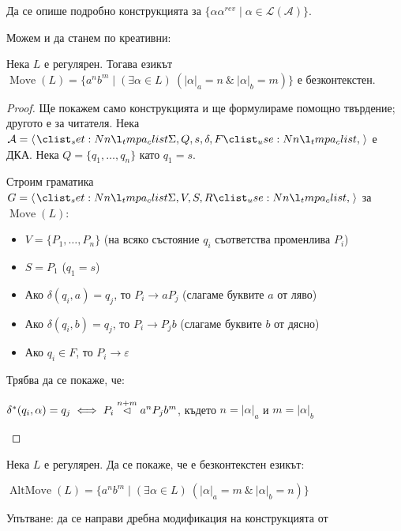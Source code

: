 \begin{problem}
Да се опише подробно конструкцията за $\{ \alpha \alpha^{rev} \mid \alpha \in \mathcal{L(A)} \}$.
\end{problem}

Можем и да станем по креативни:
\begin{claim}
    Нека $L$ е регулярен.
    Тогава езикът $\operatorname{Move}(L) = \{ a^nb^m \mid (\exists \alpha \in L) \: (|\alpha|_a = n \: \& \: |\alpha|_b = m) \}$ е безконтекстен.
\end{claim}

\begin{proof}
    Ще покажем само конструкцията и ще формулираме помощно твърдение; другото е за читателя.
    Нека $\mathcal{A} = \opair{\Sigma, Q, s, \delta, F}$ е ДКА.
    Нека $Q = \{ q_1, \dots, q_n \}$ като $q_1 = s$.

    Строим граматика $G = \opair{\Sigma, V, S, R}$ за $\operatorname{Move}(L)$:
    \begin{itemize}
        \item $V = \{ P_1, \dots, P_n \}$ (на всяко състояние $q_i$ съответства променлива $P_i$)
        \item $S = P_1$ ($q_1 = s$)
        \item Ако $\delta(q_i, a) = q_j$, то $P_i \rightarrow a P_j$ (слагаме буквите $a$ от ляво)
        \item Ако $\delta(q_i, b) = q_j$, то $P_i \rightarrow P_j b$ (слагаме буквите $b$ от дясно)
        \item Ако $q_i \in F$, то $P_i \rightarrow \varepsilon$
    \end{itemize}

    Трябва да се покаже, че:
    \begin{center}
        $\delta^*(q_i, \alpha) = q_j \iff P_i \stackrel{n + m}{\vartriangleleft} a^{n} P_j b^{m}$, където $n = |\alpha|_a$ и $m = |\alpha|_b$
    \end{center}
\end{proof}

\begin{problem}
Нека $L$ е регулярен.
Да се покаже, че е безконтекстен езикът:
\begin{center}
    $\operatorname{AltMove}(L) = \{ a^nb^m \mid (\exists \alpha \in L) \: (|\alpha|_a = m \: \& \: |\alpha|_b = n) \}$
\end{center}
Упътване: да се направи дребна модификация на конструкцията от 
\end{problem}